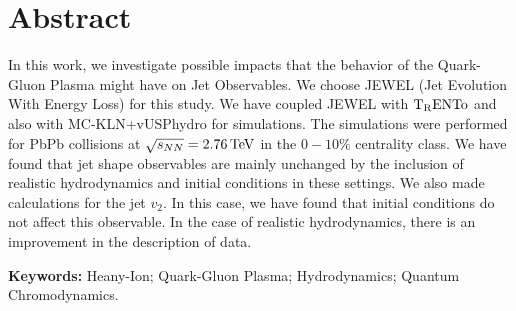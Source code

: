 \chapter*{Abstract}

In this work, we investigate possible impacts that the behavior of the Quark-Gluon Plasma might have on Jet Observables. We choose JEWEL (Jet Evolution With Energy Loss) for this study. We have coupled JEWEL with $\rm T_RENTo$ and also with MC-KLN+vUSPhydro for simulations. The simulations were performed for PbPb collisions at $\sqrt{s_{NN}} = 2.76 \, {\rm TeV}$ in the $0-10\%$ centrality class. We have found that jet shape observables are mainly unchanged by the inclusion of realistic hydrodynamics and initial conditions in these settings. We also made calculations for the jet $v_2$. In this case, we have found that initial conditions do not affect this observable. In the case of realistic hydrodynamics, there is an improvement in the description of data. 

\noindent\textbf{Keywords:} Heany-Ion; Quark-Gluon Plasma; Hydrodynamics; Quantum Chromodynamics.
